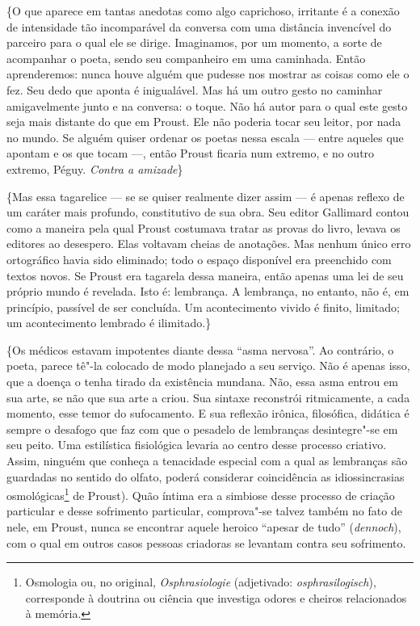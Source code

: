 \{O que aparece em tantas anedotas como algo caprichoso, irritante é a
conexão de intensidade tão incomparável da conversa com uma distância
invencível do parceiro para o qual ele se dirige. Imaginamos, por um
momento, a sorte de acompanhar o poeta, sendo seu companheiro em uma
caminhada. Então aprenderemos: nunca houve alguém que pudesse nos
mostrar as coisas como ele o fez. Seu dedo que aponta é inigualável. Mas
há um outro gesto no caminhar amigavelmente junto e na conversa: o
toque. Não há autor para o qual este gesto seja mais distante do que em
Proust. Ele não poderia tocar seu leitor, por nada no mundo. Se alguém
quiser ordenar os poetas nessa escala --- entre aqueles que apontam e os
que tocam ---, então Proust ficaria num extremo, e no outro extremo,
Péguy. \emph{Contra a amizade}\}

\{Mas essa tagarelice --- se se quiser realmente dizer assim --- é apenas
reflexo de um caráter mais profundo, constitutivo de sua obra. Seu
editor Gallimard contou como a maneira pela qual Proust costumava tratar
as provas do livro, levava os editores ao desespero. Elas voltavam
cheias de anotações. Mas nenhum único erro ortográfico havia sido
eliminado; todo o espaço disponível era preenchido com textos novos. Se
Proust era tagarela dessa maneira, então apenas uma lei de seu próprio
mundo é revelada. Isto é: lembrança. A lembrança, no entanto, não é, em
princípio, passível de ser concluída. Um acontecimento vivido é finito,
limitado; um acontecimento lembrado é ilimitado.\}

\{Os médicos estavam impotentes diante dessa ``asma nervosa''. Ao
contrário, o poeta, parece tê"-la colocado de modo planejado a seu
serviço. Não é apenas isso, que a doença o tenha tirado da existência
mundana. Não, essa asma entrou em sua arte, se não que sua arte a criou.
Sua sintaxe reconstrói ritmicamente, a cada momento, esse temor do
sufocamento. E sua reflexão irônica, filosófica, didática é sempre o
desafogo que faz com que o pesadelo de lembranças desintegre"-se em seu
peito. Uma estilística fisiológica levaria ao centro desse processo
criativo. Assim, ninguém que conheça a tenacidade especial com a qual as
lembranças são guardadas no sentido do olfato, poderá considerar
coincidência as idiossincrasias osmológicas\footnote{Osmologia ou,
  no original, \emph{Osphrasiologie} (adjetivado:
  \emph{osphrasilogisch}), corresponde à doutrina ou ciência que
  investiga odores e cheiros relacionados à memória. \versal{[N. E.]}} de Proust). Quão
íntima era a simbiose desse processo de criação particular e desse
sofrimento particular, comprova"-se talvez também no fato de nele, em
Proust, nunca se encontrar aquele heroico ``apesar de tudo''
(\emph{dennoch}), com o qual em outros casos pessoas criadoras se
levantam contra seu sofrimento.

